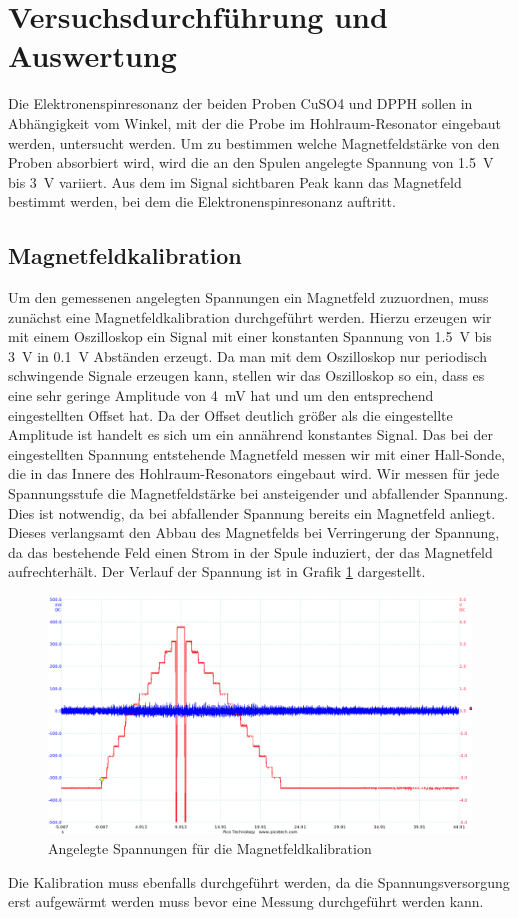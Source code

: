 \documentclass{scrartcl}
\begin{document}
\section{Versuchsdurchführung und Auswertung}
Die Elektronenspinresonanz der beiden Proben CuSO4 und DPPH sollen in Abhängigkeit vom Winkel, mit der die Probe im Hohlraum-Resonator eingebaut werden, untersucht werden. Um zu bestimmen welche Magnetfeldstärke von den Proben absorbiert wird, wird die an den Spulen angelegte Spannung von \SI{1.5}{V} bis \SI{3}{V} variiert. Aus dem im Signal sichtbaren Peak kann das Magnetfeld bestimmt werden, bei dem die Elektronenspinresonanz auftritt. 

\subsection{Magnetfeldkalibration}
Um den gemessenen angelegten Spannungen ein Magnetfeld zuzuordnen, muss zunächst eine Magnetfeldkalibration durchgeführt werden.
Hierzu erzeugen wir mit einem Oszilloskop ein Signal mit einer konstanten Spannung von \SI{1.5}{V} bis \SI{3}{V} in \SI{0.1}{V} Abständen erzeugt. Da man mit dem Oszilloskop nur periodisch schwingende Signale erzeugen kann, stellen wir das Oszilloskop so ein, dass es eine sehr geringe Amplitude von \SI{4}{mV} hat und um den entsprechend eingestellten Offset hat. Da der Offset deutlich größer als die eingestellte Amplitude ist handelt es sich um ein annährend konstantes Signal. 
Das bei der eingestellten Spannung entstehende Magnetfeld messen wir mit einer Hall-Sonde, die in das Innere des Hohlraum-Resonators eingebaut wird. Wir messen für jede Spannungsstufe die Magnetfeldstärke bei ansteigender und abfallender Spannung. Dies ist notwendig, da bei abfallender Spannung bereits ein Magnetfeld anliegt. Dieses verlangsamt den Abbau des Magnetfelds bei Verringerung der Spannung, da das bestehende Feld einen Strom in der Spule induziert, der das Magnetfeld aufrechterhält. Der Verlauf der Spannung ist in Grafik \ref{fig:Spannung} dargestellt. 
\begin{figure}[h!]
    \centering
    \includegraphics[scale=0.7]{3_1MagnetfeldkalibrationSpannungAufsteigundUndAbsteigend.png}
    \caption{Angelegte Spannungen für die Magnetfeldkalibration}
    \label{fig:Spannung}
\end{figure}
Die Kalibration muss ebenfalls durchgeführt werden, da die Spannungsversorgung erst aufgewärmt werden muss bevor eine Messung durchgeführt werden kann. 
\end{document}
